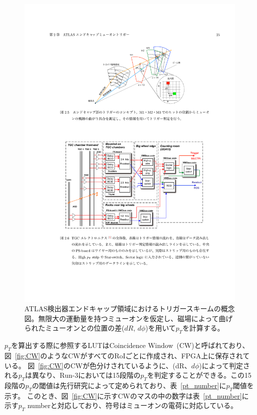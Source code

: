 \begin{figure}[tb]
  \centering
  \includegraphics[clip, width=15cm]{fig/3/akatsuka_mt_trigger_scheme.pdf}
  \caption{ATLAS検出器エンドキャップ領域におけるトリガースキームの概念図\cite{article:akatsuka-mron}。無限大の運動量を持つミューオンを仮定し、磁場によって曲げられたミューオンとの位置の差($dR$, $d\phi$)を用いて$p_T$を計算する。}
  \label{fig:trigger-scheme}
\end{figure}


$p_T$を算出する際に参照するLUTはCoincidence Window~(CW)と呼ばれており、図~\ref{fig:CW}のようなCWがすべてのRoIごとに作成され、FPGA上に保存されている。
図~\ref{fig:CW}のCWが色分けされているように、(dR、$d\phi$)によって判定される$p_T$は異なり、Run-3においては15段階の$p_T$を判定することができる。この15段階の$p_T$の閾値は先行研究\cite{article:shiomi-mron}によって定められており、表~\ref{pt_number}に$p_T$閾値を示す。
このとき、図~\ref{fig:CW}に示すCWのマスの中の数字は表~\ref{pt_number}に示す$p_T$ numberと対応しており、符号はミューオンの電荷に対応している。

